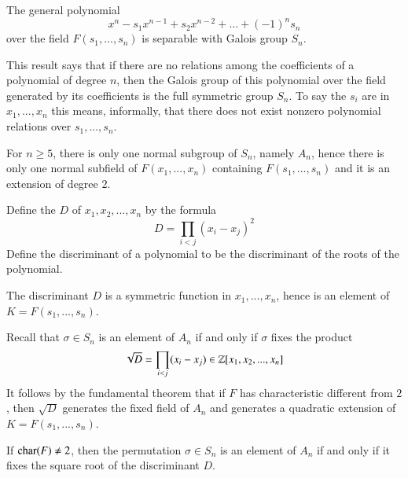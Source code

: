 \begin{theorem}
    The general polynomial \begin{equation*}
        x^n-s_1x^{n-1}+s_2x^{n-2}+...+(-1)^ns_n
    \end{equation*}
    over the field $F(s_1,...,s_n)$ is separable with Galois group $S_n$.
\end{theorem}

This result says that if there are no relations among the coefficients of a polynomial of degree $n$, then the Galois group of this polynomial over the field generated by its coefficients is the full symmetric group $S_n$. To say the $s_i$ are  in $x_1,...,x_n$ this means, informally, that there does not exist nonzero polynomial relations over $s_1,...,s_n$.


For $n \geq 5$, there is only one normal subgroup of $S_n$, namely $A_n$, hence there is only one normal subfield of $F(x_1,...,x_n)$ containing $F(s_1,...,s_n)$ and it is an extension of degree $2$. 

\begin{definition}
    Define the  $D$ of $x_1,x_2,...,x_n$ by the formula \begin{equation*}
        D = \prod_{i < j}(x_i-x_j)^2
    \end{equation*}
    Define the discriminant of a polynomial to be the discriminant of the roots of the polynomial.
\end{definition}

The discriminant $D$ is a symmetric function in $x_1,...,x_n$, hence is an element of $K = F(s_1,...,s_n)$.

Recall that $\sigma \in S_n$ is an element of $A_n$ if and only if $\sigma$ fixes the product \begin{equation*}
    \sqrt{D} = \prod_{i<j}(x_i - x_j) \in \mathbb Z[x_1,x_2,...,x_n]
\end{equation*}
It follows by the fundamental theorem that if $F$ has characteristic different from $2$, then $\sqrt{D}$ generates the fixed field of $A_n$ and generates a quadratic extension of $K = F(s_1,...,s_n)$. 

\begin{proposition}
    If $\operatorname{char}(F) \neq 2$, then the permutation $\sigma \in S_n$ is an element of $A_n$ if and only if it fixes the square root of the discriminant $D$.
\end{proposition}


